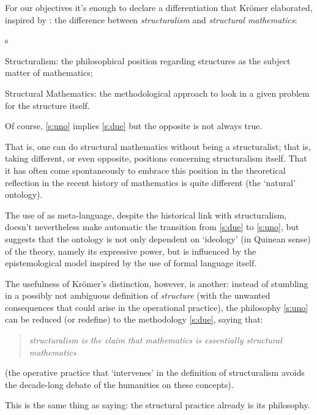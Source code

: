 For our objectives it's enough to declare a differentiation that Kr\"omer
elaborated, inspired by \cite{Cor96}: the difference between \emph{structuralism} and \emph{structural mathematics}:
\begin{enumtag}{s}
    \item \label{s:uno} Structuralism: the philosophical position regarding structures as the subject matter of mathematics;
    \item \label{s:due} Structural Mathematics: the methodological approach to look in a given problem for the structure itself.
\end{enumtag}
Of course, \ref{s:uno} implies \ref{s:due} but the opposite is not always true.
\begin{remark} \label{weak_structuralism}
    That is, one can do structural mathematics without being a structuralist; that is, taking different, or even opposite, positions concerning structuralism itself. That it has often come spontaneously to embrace this position in the theoretical reflection in the recent history of mathematics is quite different (the `natural' ontology).

    The use of  as meta-language, despite the historical link with structuralism, doesn't nevertheless make automatic the transition from
    \ref{s:due} to  \ref{s:uno}, but suggests that the ontology is not only
    dependent on `ideology' (in Quinean sense) of the theory, namely its expressive power, but is influenced by the epistemological model inspired by the use of formal language itself.
\end{remark}
The usefulness of Kr\"omer's distinction, however, is another: instead of stumbling in a possibly not ambiguous definition of \textit{structure} (with the unwanted consequences that could arise in the operational practice), the philosophy \ref{s:uno} can be reduced (or redefine) to the methodology \ref{s:due}, saying that:
\begin{quote}
    \emph{structuralism is the claim that mathematics
        is essentially structural mathematics} \cite{kromer2007tool}
\end{quote}
(the operative practice that `intervenes' in the definition of structuralism avoids the decade-long debate of the humanities on these concepts).

This is the same thing as saying: the structural practice already is its philosophy.

